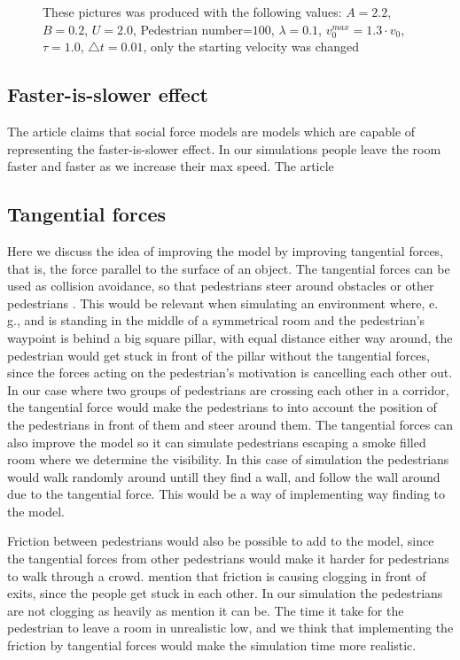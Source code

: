 \begin{figure}
\caption{These pictures was produced with the following values: $A=2.2$, $B=0.2$, $U=2.0$, Pedestrian number=$100$, $\lambda=0.1$, $v^{max}_0=1.3 \cdot v_0$, $\tau = 1.0$, $\triangle t = 0.01$, only the starting velocity was changed}
\label{fig:problemSenario}
\end{figure}
\subsection{Faster-is-slower effect}
The article \cite{self-org} claims that social force models are models which are capable of representing the faster-is-slower effect. In our simulations people leave the room faster and faster as we increase their max speed. The article 

\subsection{Tangential forces}
Here we discuss the idea of improving the model by improving tangential forces, that is, the force parallel to the surface of an object.
The tangential forces can be used as collision avoidance, so that pedestrians steer around obstacles or other pedestrians \cite{tang}.
This would be relevant when simulating an environment where, e. g., and is standing in the middle of a symmetrical room and the pedestrian's waypoint
is behind a big square pillar, with equal distance either way around, the pedestrian would get stuck in front of the pillar without the tangential forces,
since the forces acting on the pedestrian's motivation is cancelling each other out. 
In our case where two groups of pedestrians are crossing each other in a corridor, the tangential force would make the pedestrians to into account
the position of the pedestrians in front of them and steer around them.
The tangential forces can also improve the model so it can simulate pedestrians escaping a smoke filled room where we determine the visibility.
In this case of simulation the pedestrians would walk randomly around untill they find a wall, and follow the wall around due to the tangential force.
This would be a way of implementing way finding to the model.

Friction between pedestrians would also be possible to add to the model, since the tangential forces from other pedestrians would make it
harder for pedestrians to walk through a crowd. \cite{self-org} mention that friction is causing clogging in front of exits, since the people
get stuck in each other. In our simulation the pedestrians are not clogging as heavily as \cite{self-org} mention it can be.
The time it take for the pedestrian to leave a room in unrealistic low, and we think that implementing the friction by tangential forces
would make the simulation time more realistic.
